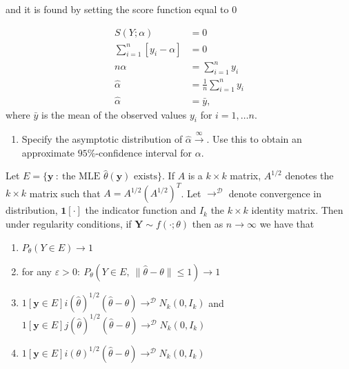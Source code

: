 and it is found by setting the score function equal to $0$

\begin{align*}
    S\left(Y; \alpha \right) &= 0\\
    \sum_{i=1}^n \left[y_i - \alpha \right]&= 0\\
    n\alpha &= \sum_{i=1}^n y_i\\
    \hat{\alpha} &= \frac{1}{n} \sum_{i=1}^n y_i \\
    \hat{\alpha} &= \bar{y},
\end{align*}
where $\bar{y}$ is the mean of the observed values $y_i$ for $i = 1, \ldots n$.

\begin{enumerate}[resume]
    \item  Specify the asymptotic distribution of $\hat{\alpha}\xrightarrow \infty$. Use this to obtain an approximate $95\%$-confidence interval for $\alpha$.
\end{enumerate}

\begin{theorem}\label{th:distribution_ml_estimator}
Let $E = \{\mathbf{y} \ : \ \text{the MLE } \hat{\theta}(\mathbf{y}) \text{ exists}\}$. 
If $A$ is a $k \times k$ matrix, $A^{1/2}$ denotes the $k \times k$ matrix such that $A = A^{1/2}\left( A^{1/2} \right)^T$.
Let $\rightarrow^\mathcal{D}$ denote convergence in distribution, $\mathbf{1}[\cdot]$ the indicator function and $I_k$ the $k \times k$ identity matrix.
Then under regularity conditions, if $\mathbf{Y} \sim f(\cdot;\theta)$ then as $n \rightarrow \infty$ we have that
\begin{enumerate}
    \item $P_\theta(Y \in E) \rightarrow 1$
    \item for any $\varepsilon > 0: \ P_\theta(Y \in E, \ \|\hat{\theta} - \theta\| \leq 1) \rightarrow 1$
    \item $1[\mathbf{y} \in E] i(\hat{\theta})^{1/2}(\hat{\theta} - \theta) \rightarrow^\mathcal{D} N_k(0, I_k)$ and $1[\mathbf{y} \in E] j(\hat{\theta})^{1/2}(\hat{\theta} - \theta) \rightarrow^\mathcal{D} N_k(0, I_k)$
    \item $1[\mathbf{y} \in E] i(\theta)^{1/2}(\hat{\theta} - \theta) \rightarrow^\mathcal{D} N_k(0, I_k)$
\end{enumerate}
\end{theorem}


